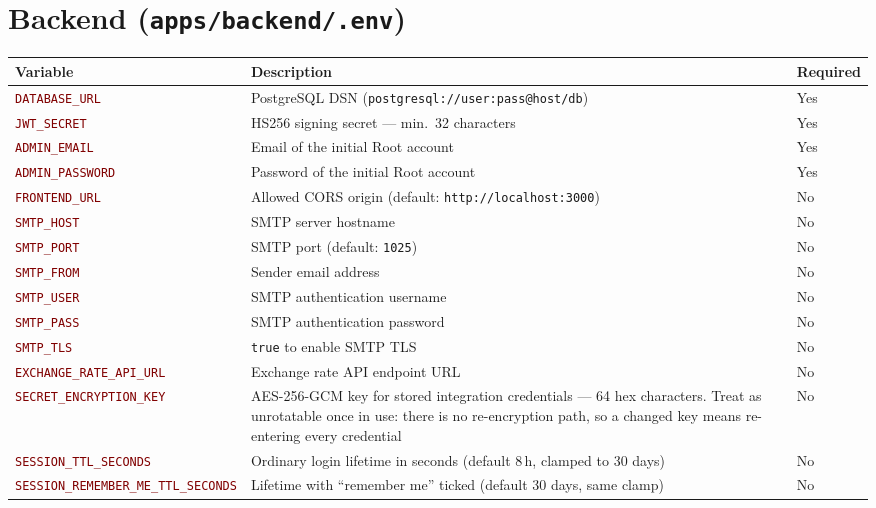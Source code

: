 \documentclass[12pt,a4paper,twoside]{report}
\newcommand{\code}[1]{\texttt{#1}}
\newcommand{\env}[1]{\texttt{\textcolor{Maroon}{#1}}}
\begin{document}
\section*{Backend (\texttt{apps/backend/.env})}

\begin{longtable}{@{}L{4.5cm}L{7.5cm}l@{}}
  \toprule
  \textbf{Variable} & \textbf{Description} & \textbf{Required} \\
  \midrule
  \endhead
  \env{DATABASE\_URL}           & PostgreSQL DSN (\code{postgresql://user:pass@host/db}) & Yes \\
  \env{JWT\_SECRET}             & HS256 signing secret — min.\ 32 characters     & Yes \\
  \env{ADMIN\_EMAIL}            & Email of the initial Root account               & Yes \\
  \env{ADMIN\_PASSWORD}         & Password of the initial Root account            & Yes \\
  \env{FRONTEND\_URL}           & Allowed CORS origin (default: \code{http://localhost:3000}) & No \\
  \env{SMTP\_HOST}              & SMTP server hostname                            & No  \\
  \env{SMTP\_PORT}              & SMTP port (default: \code{1025})                & No  \\
  \env{SMTP\_FROM}              & Sender email address                            & No  \\
  \env{SMTP\_USER}              & SMTP authentication username                    & No  \\
  \env{SMTP\_PASS}              & SMTP authentication password                    & No  \\
  \env{SMTP\_TLS}               & \code{true} to enable SMTP TLS                  & No  \\
  \env{EXCHANGE\_RATE\_API\_URL} & Exchange rate API endpoint URL                 & No  \\
  \env{SECRET\_ENCRYPTION\_KEY} & AES-256-GCM key for stored integration credentials — 64 hex characters. Treat as unrotatable once in use: there is no re-encryption path, so a changed key means re-entering every credential & No \\
  \env{SESSION\_TTL\_SECONDS}   & Ordinary login lifetime in seconds (default 8\,h, clamped to 30 days) & No \\
  \env{SESSION\_REMEMBER\_ME\_TTL\_SECONDS} & Lifetime with ``remember me'' ticked (default 30 days, same clamp) & No \\

\end{longtable}
\end{document}
